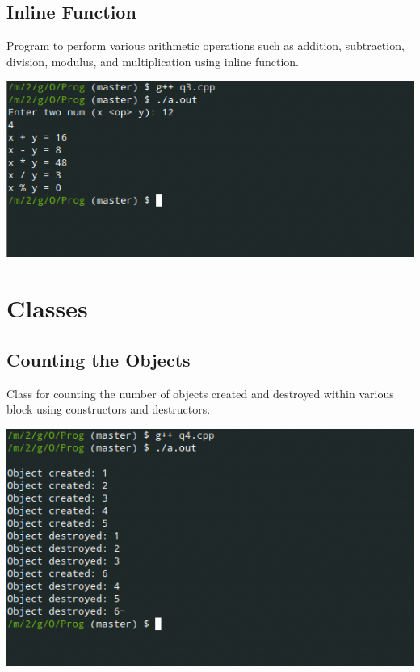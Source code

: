 \documentclass[oneside, a4paper,11pt]{book}
\begin{document}
\section{Inline Function}

Program to perform various arithmetic operations such as addition, subtraction, division, modulus, and multiplication using inline function.


\includegraphics[width=\textwidth]{q3.png}

\chapter{Classes}
\section{Counting the Objects}

Class for counting the number of objects created and destroyed within various block using constructors and destructors.


\includegraphics[width=\textwidth]{q4.png}
\end{document}
